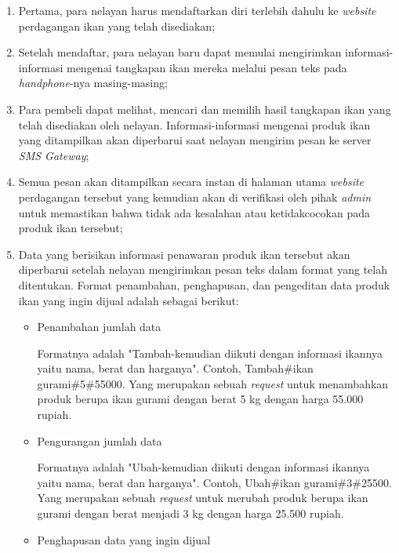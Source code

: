 \documentclass[a4paper]{article}
\begin{document}
\begin{enumerate}
    \begin{enumerate}
        \item Pertama, para nelayan harus mendaftarkan diri terlebih dahulu ke \textit{website} perdagangan ikan yang telah disediakan\autocite{c2c-fish-marketplace};
        \item Setelah mendaftar, para nelayan baru dapat memulai mengirimkan informasi-informasi mengenai tangkapan ikan mereka melalui pesan teks pada \textit{handphone}-nya masing-masing\autocite{c2c-fish-marketplace};
        \item Para pembeli dapat melihat, mencari dan memilih hasil tangkapan ikan yang telah disediakan oleh nelayan. Informasi-informasi mengenai produk ikan yang ditampilkan akan diperbarui saat nelayan mengirim pesan ke server \textit{SMS Gateway}\autocite{c2c-fish-marketplace};
        \item Semua pesan akan ditampilkan secara instan di halaman utama \textit{website} perdagangan tersebut yang kemudian akan di verifikasi oleh pihak \textit{admin} untuk memastikan bahwa tidak ada kesalahan atau ketidakcocokan pada produk ikan tersebut\autocite{c2c-fish-marketplace};
        \item Data yang berisikan informasi penawaran produk ikan tersebut akan diperbarui setelah nelayan mengirimkan pesan teks dalam format yang telah ditentukan\autocite{c2c-fish-marketplace}. Format penambahan, penghapusan, dan pengeditan data produk ikan yang ingin dijual adalah sebagai berikut:

        \begin{itemize}
            \item Penambahan jumlah data

            Formatnya adalah "Tambah-kemudian diikuti dengan informasi ikannya yaitu nama, berat dan harganya". Contoh, Tambah\#ikan gurami\#5\#55000. Yang merupakan sebuah \textit{request} untuk menambahkan produk berupa ikan gurami dengan berat 5 kg dengan harga 55.000 rupiah.

            \item Pengurangan jumlah data

            Formatnya adalah "Ubah-kemudian diikuti dengan informasi ikannya yaitu nama, berat dan harganya". Contoh, Ubah\#ikan gurami\#3\#25500. Yang merupakan sebuah \textit{request} untuk merubah produk berupa ikan gurami dengan berat menjadi 3 kg dengan harga 25.500 rupiah.

            \item Penghapusan data yang ingin dijual


\end{itemize}
\end{enumerate}
\end{enumerate}
\end{document}

